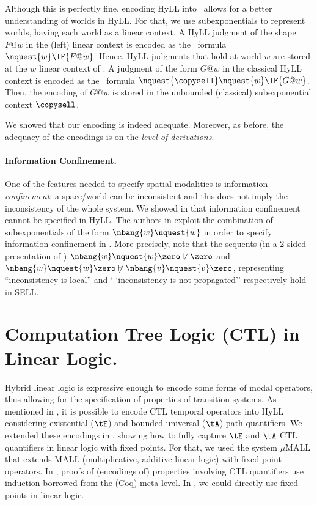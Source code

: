 \documentclass{llncs}
\begin{document}
Although this is perfectly fine, 
encoding  HyLL into \sellU\  allows for a better understanding  of worlds in HyLL. 
For that, we use subexponentials to represent worlds, 
having each world as a  linear context. 
A HyLL judgment of the shape $F@w$ in the (left)
linear context is encoded as the \sellU\ formula $\nquest{w}\lF{F@w}$. 
Hence, HyLL judgments that hold at world $w$ are stored at the $w$ 
linear context of \sellU. A judgment of the form $G@w$ in the
classical HyLL context is encoded as the \sellU\ formula 
$\nquest{\copysell}\nquest{w}\lF{G@w}$. Then, the encoding of $G@w$ 
is stored in the unbounded (classical) subexponential context $\copysell$. 

We showed that our encoding is indeed adequate.
Moreover, as before, 
the adequacy of the encodings is on the {\em level of derivations}.

\paragraph{Information Confinement.} 
One of the features needed to specify spatial modalities  is information 
\emph{confinement}: a space/world can be inconsistent and this does not imply 
the inconsistency of the whole system. 
We showed in \cite{Despeyroux-Olarte-Pimentel:lsfa-16}
that information confinement cannot be specified in HyLL. 
The authors in   \cite{NigamOlartePimentel:concur-13} exploit the combination 
of subexponentials of the form $\nbang{w}\nquest{w}$  in order to specify 
information confinement in \sellU. 
  More precisely, note that the sequents (in a 2-sided presentation of \sell) 
$\nbang{w}\nquest{w}\zero \not\vdash \zero$ 
and $\nbang{w}\nquest{w}\zero \not\vdash \nbang{v}\nquest{v}\zero$,  
representing ``inconsistency is local'' and `
`inconsistency is not propagated'' respectively hold in SELL. 


\section{Computation Tree Logic (CTL) in Linear Logic.}
\label{sec:temporal}
% 

Hybrid linear logic is expressive enough to encode some forms of modal 
operators, thus allowing for the specification of properties of transition 
systems. As mentioned in \cite{deMaria-Despeyroux-Felty:14-fmmb}, 
it is possible to encode CTL temporal operators into HyLL considering 
existential ($\tE$) and bounded universal ($\tA$) path quantifiers. 
We extended these encodings
in \cite{Despeyroux-Olarte-Pimentel:lsfa-16}, showing how to fully 
capture $\tE$ and $\tA$ CTL quantifiers in linear logic with fixed points. 
For that, we used the system $\mu$MALL \cite{DBLP:journals/tocl/Baelde12} 
that extends MALL
(multiplicative, additive linear logic) with fixed point operators.
In \cite{deMaria-Despeyroux-Felty:14-fmmb}, 
proofs of (encodings of) properties involving CTL quantifiers 
use induction borrowed from the (Coq) meta-level.
In \cite{Despeyroux-Olarte-Pimentel:lsfa-16}, we could directly use 
fixed points in linear logic.
\end{document}
